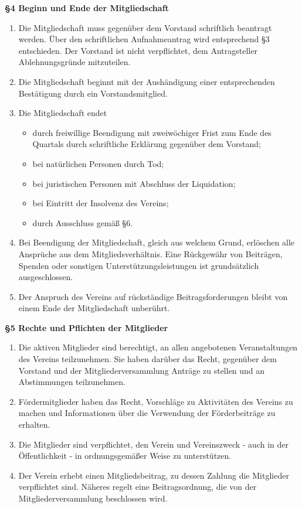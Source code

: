 \documentclass[a4paper,
               12pt,
               titlepage,
               parskip=half]{scrartcl}
\begin{document}
\textbf{§4 Beginn und Ende der Mitgliedschaft}
{\small
	\begin{enumerate}
		\item Die Mitgliedschaft muss gegenüber dem Vorstand schriftlich beantragt werden. Über den schriftlichen Aufnahmeantrag wird entsprechend §3 entschieden. Der Vorstand ist nicht verpflichtet, dem Antragsteller Ablehnungsgründe mitzuteilen.
		\item Die Mitgliedschaft beginnt mit der Aushändigung einer entsprechenden Bestätigung durch ein Vorstandsmitglied.
		\item Die Mitgliedschaft endet
		\begin{itemize}
			\item durch freiwillige Beendigung mit zweiwöchiger Frist zum Ende des Quartals durch schriftliche Erklärung gegenüber dem Vorstand;
			\item bei natürlichen Personen durch Tod;
			\item bei juristischen Personen mit Abschluss der Liquidation;
			\item bei Eintritt der Insolvenz des Vereins;
			\item durch Ausschluss gemäß §6.
		\end{itemize}
		\item Bei Beendigung der Mitgliedschaft, gleich aus welchem Grund, erlöschen alle Ansprüche aus dem Mitgliedsverhältnis. Eine Rückgewähr von Beiträgen, Spenden oder sonstigen Unterstützungsleistungen ist grundsätzlich ausgeschlossen.
		\item Der Anspruch des Vereins auf rückständige Beitragsforderungen bleibt von einem Ende der Mitgliedschaft unberührt.
	\end{enumerate}
}

\vspace{1.0em}

\textbf{§5 Rechte und Pflichten der Mitglieder}
{\small
	\begin{enumerate}
		\item Die aktiven Mitglieder sind berechtigt, an allen angebotenen Veranstaltungen des Vereins teilzunehmen. Sie haben darüber das Recht, gegenüber dem Vorstand und der Mitgliederversammlung Anträge zu stellen und an Abstimmungen teilzunehmen.
		\item Fördermitglieder haben das Recht, Vorschläge zu Aktivitäten des Vereins zu machen und Informationen über die Verwendung der Förderbeiträge zu erhalten.
		\item Die Mitglieder sind verpflichtet, den Verein und Vereinszweck - auch in der Öffentlichkeit - in ordnungsgemäßer Weise zu unterstützen.
		\item Der Verein erhebt einen Mitgliedsbeitrag, zu dessen Zahlung die Mitglieder verpflichtet sind. Näheres regelt eine Beitragsordnung, die von der Mitgliederversammlung beschlossen wird.
	\end{enumerate}
}
\end{document}
